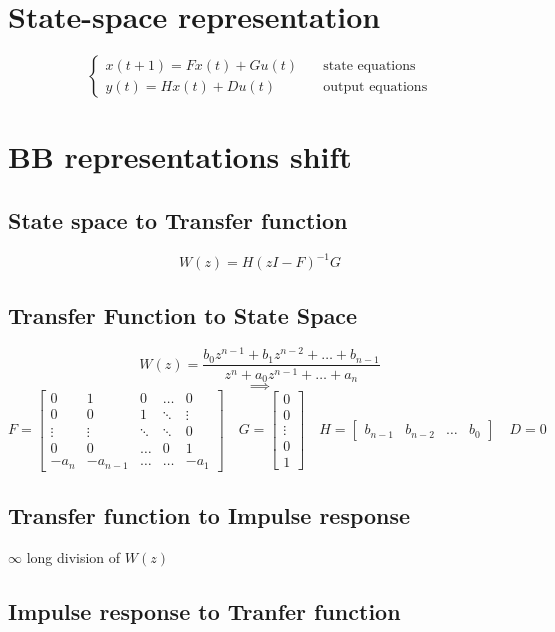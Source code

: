 \documentclass{article}
\begin{document}
\section{State-space representation}
\[
\begin{cases}
x(t+1)=Fx(t)+Gu(t)&\quad\text{state equations}\\
y(t)=Hx(t)+Du(t)&\quad\text{output equations}
\end{cases}
\]
\section{BB representations shift}

\subsection{State space to Transfer function}
\[
W(z)=H(zI-F)^{-1}G
\]

\subsection{Transfer Function to State Space}
\[
W(z)=\frac{b_0z^{n-1}+b_1z^{n-2}+\dots+b_{n-1}}{z^n+a_0z^{n-1}+\dots+a_n}
\]
\[\implies\]
\[
F=
\begin{bmatrix}
0&1&0&\dots&0\\
0&0&1&\ddots&\vdots\\
\vdots&\vdots&\ddots&\ddots&0\\
0&0&\dots&0&1\\
-a_n&-a_{n-1}&\dots&\dots&-a_1
\end{bmatrix}
\quad
G=\begin{bmatrix}
0\\0\\\vdots\\0\\1
\end{bmatrix}
\quad
H=\begin{bmatrix}
b_{n-1}&b_{n-2}&\dots&b_0
\end{bmatrix}
\quad
D=0
\]

\subsection{Transfer function to Impulse response}
$\infty$ long division of $W(z)$

\subsection{Impulse response to Tranfer function}
\end{document}
